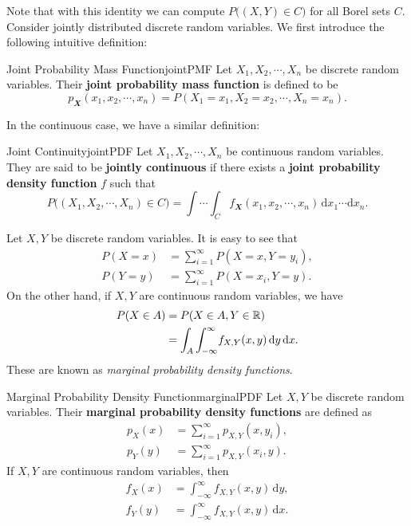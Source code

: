 \documentclass[math]{amznotes}
\theoremstyle{remark}
\newcommand{\0}{\mathbf{0}}
\newcommand{\1}{\mathbf{1}}
\begin{document}
Note that with this identity we can compute $P\bigl((X, Y) \in C\bigr)$ for all Borel sets $C$. Consider jointly distributed discrete random variables. We first introduce the following intuitive definition:
\begin{dfnbox}{Joint Probability Mass Function}{jointPMF}
    Let $X_1, X_2, \cdots, X_n$ be discrete random variables. Their {\color{red} \textbf{joint probability mass function}} is defined to be
    \begin{equation*}
        p_{\mathbfit{X}}(x_1, x_2, \cdots, x_n) = P(X_1 = x_1, X_2 = x_2, \cdots, X_n = x_n).
    \end{equation*}
\end{dfnbox} 
In the continuous case, we have a similar definition:
\begin{dfnbox}{Joint Continuity}{jointPDF}
    Let $X_1, X_2, \cdots, X_n$ be continuous random variables. They are said to be {\color{red} \textbf{jointly continuous}} if there exists a {\color{red} \textbf{joint probability density function}} $f$ such that
    \begin{equation*}
        P\bigl((X_1, X_2, \cdots, X_n) \in C\bigr) = \int\cdots\int_{C}\!f_{\mathbfit{X}}(x_1, x_2, \cdots, x_n)\,\mathrm{d}x_1\cdots\mathrm{d}x_n.
    \end{equation*}
\end{dfnbox}
Let $X, Y$ be discrete random variables. It is easy to see that
\begin{align*}
    P(X = x) & = \sum_{i = 1}^{\infty}P(X = x, Y = y_i), \\
    P(Y = y) & = \sum_{i = 1}^{\infty}P(X = x_i, Y = y).
\end{align*}
On the other hand, if $X, Y$ are continuous random variables, we have
\begin{align*}
    P(X \in A) & = P(X \in A, Y \in \mathbb{R}) \\
    & = \int_{A}\int_{-\infty}^{\infty}\!f_{X, Y}(x, y)\,\mathrm{d}y\,\mathrm{d}x.
\end{align*}
These are known as \textit{marginal probability density functions}.
\begin{dfnbox}{Marginal Probability Density Function}{marginalPDF}
    Let $X, Y$ be discrete random variables. Their {\color{red} \textbf{marginal probability density functions}} are defined as
    \begin{align*}
        p_X(x) & = \sum_{i = 1}^{\infty}p_{X, Y}(x, y_i), \\
        p_Y(y) & = \sum_{i = 1}^{\infty}p_{X, Y}(x_i, y).
    \end{align*}
    If $X, Y$ are continuous random variables, then
    \begin{align*}
        f_X(x) & = \int_{-\infty}^{\infty}\!f_{X, Y}(x, y)\,\mathrm{d}y, \\
        f_Y(y) & = \int_{-\infty}^{\infty}\!f_{X, Y}(x, y)\,\mathrm{d}x.
    \end{align*}
\end{dfnbox}
\end{document}
